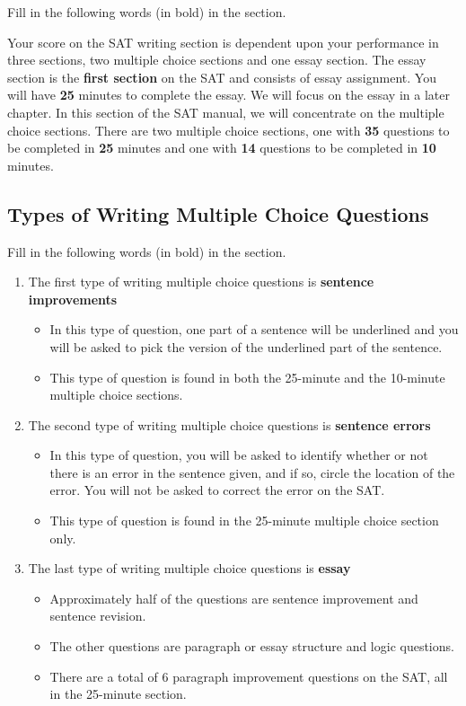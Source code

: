 Fill in the following words (in bold) in the section. 

Your score on the SAT writing section is dependent upon your performance in three sections,
two multiple choice sections and one essay section. The essay section is the \textbf{first section} on
the SAT and consists of essay assignment. You will have \textbf{25} minutes
to complete the essay. We will focus on the essay in a later chapter.
In this section of the SAT manual, we will concentrate on the multiple choice sections.
There are two multiple choice sections, one with \textbf{35} questions to be completed in \textbf{25}
minutes and one with \textbf{14} questions to be completed in \textbf{10}
minutes.

\subsection{Types of Writing Multiple Choice Questions}

Fill in the following words (in bold) in the section.

\begin{enumerate}
\item The first type of writing multiple choice questions is \textbf{sentence improvements}
\begin{itemize}
\item In this type of question, one part of a sentence will be underlined and you will be asked to pick the version of the underlined part of the sentence.
\item This type of question is found in both the 25-minute and the 10-minute multiple choice sections.
\end{itemize}

\item The second type of writing multiple choice questions is \textbf{sentence errors}

\begin{itemize}
\item In this type of question, you will be asked to identify whether or not there is an error in the sentence given, and if so, circle the location of the error. You will not be asked to correct the error on the SAT.
\item This type of question is found in the 25-minute multiple choice section only.
\end{itemize} 

\item The last type of writing multiple choice questions is \textbf{essay}

\begin{itemize}
\item Approximately half of the questions are sentence improvement and sentence revision.
\item The other questions are paragraph or essay structure and logic questions.
\item There are a total of 6 paragraph improvement questions on the SAT, all in the 25-minute section.
\end{itemize}

\end{enumerate}

